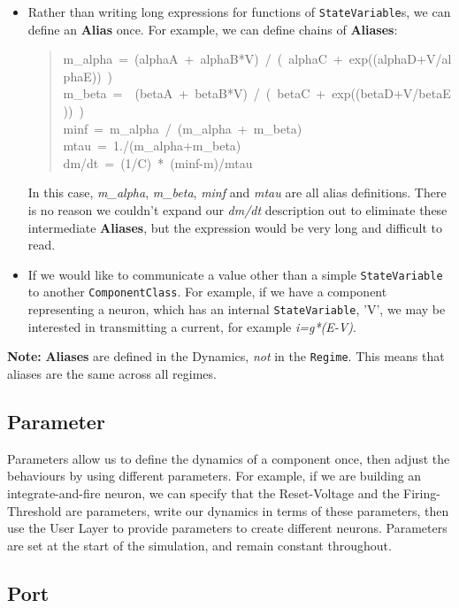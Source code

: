 \documentclass{article}
\newcommand{\note}[1]{%
\begin{center}
\colorbox{issuecolor}{\parbox{0.8\linewidth}{\textbf{Note:} #1}}
\end{center}%
}
\begin{document}
\begin{itemize}
\item Rather than writing long expressions for functions of {\tt StateVariable}s,
we can define an \textbf{Alias} once. For example, we can define chains of
\textbf{Aliases}:
%
\begin{quote}{\ttfamily \raggedright \noindent
m\_alpha~=~(alphaA~+~alphaB*V)~/~(~alphaC~+~exp((alphaD+V/alphaE))~)\\
m\_beta~=~~(betaA~+~betaB*V)~/~(~betaC~+~exp((betaD+V/betaE))~)\\
minf~=~m\_alpha~/~(m\_alpha~+~m\_beta)\\
mtau~=~1./(m\_alpha+m\_beta)\\
dm/dt~=~(1/C)~*~(minf-m)/mtau
}
\end{quote}

In this case, \emph{m\_alpha}, \emph{m\_beta}, \emph{minf} and \emph{mtau} are all
alias definitions. There is no reason we couldn't expand our \textsl{dm/dt}
description out to eliminate these intermediate \textbf{Aliases}, but the expression
would be very long and difficult to read.

\item If we would like to communicate a value other than a simple {\tt StateVariable}
to another {\tt ComponentClass}. For example, if we have a component representing a
neuron, which has an internal {\tt StateVariable}, 'V', we may be interested in
transmitting a current, for example \textsl{i=g*(E-V)}.
\end{itemize}

\note{\textbf{Aliases} are defined in the Dynamics, \emph{not} in the
{\tt Regime}. This means that aliases are the same across all regimes.}

\subsection{Parameter}
\label{parameters}

Parameters allow us to define the dynamics of a component once, then
adjust the behaviours by using different parameters. For example, if
we are building an integrate-and-fire neuron, we can specify that the
Reset-Voltage and the Firing-Threshold are parameters, write our
dynamics in terms of these parameters, then use the User Layer to
provide parameters to create different neurons. Parameters are set at
the start of the simulation, and remain constant throughout.

\subsection{Port}
\label{ports}
\end{document}
